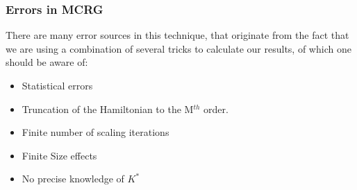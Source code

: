 \subsubsection*{Errors in MCRG}

There are many error sources in this technique, that originate from the fact that we are using a combination of several tricks to calculate our results, of which one should be aware of:

\begin{itemize}
\item Statistical errors
\item Truncation of the Hamiltonian to the M$^{th}$ order.
\item Finite number of scaling iterations
\item Finite Size effects
\item No precise knowledge of $K^*$
\end{itemize}

















